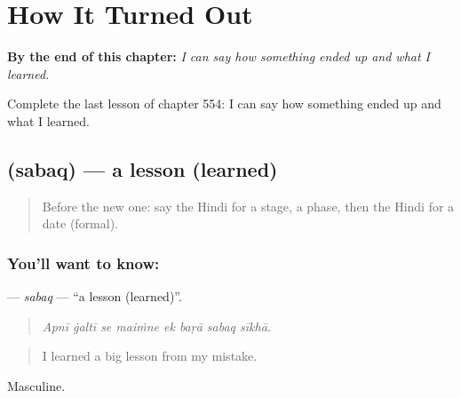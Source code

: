 
\chapter{How It Turned Out}
\label{ch:hi-how-it-turned-out}

\begin{chapteropening}
\textbf{By the end of this chapter:} \emph{I can say how something ended up and what I learned.}

Complete the last lesson of chapter 554: I can say how something ended up and what I learned.
\end{chapteropening}

\section[\texorpdfstring{\hi{सबक़} (sabaq)}{सबक़ (sabaq)}]{ (sabaq) — a lesson (learned)}

\label{lesson:HI-C554-sabaq}



\begin{quote}
Before the new one: say the Hindi for a stage, a phase, then the Hindi for a date (formal).
\end{quote}

\subsection*{You'll want to know: }
\textbf{} — \emph{sabaq} — \textquotedblleft{}a lesson (learned)\textquotedblright{}.

\begin{quote}
       
\end{quote}

\begin{quote}
\emph{Apnī ġaltī se maiṁne ek baṛā sabaq sīkhā.}
\end{quote}

\begin{quote}
I learned a big lesson from my mistake.
\end{quote}

Masculine.


